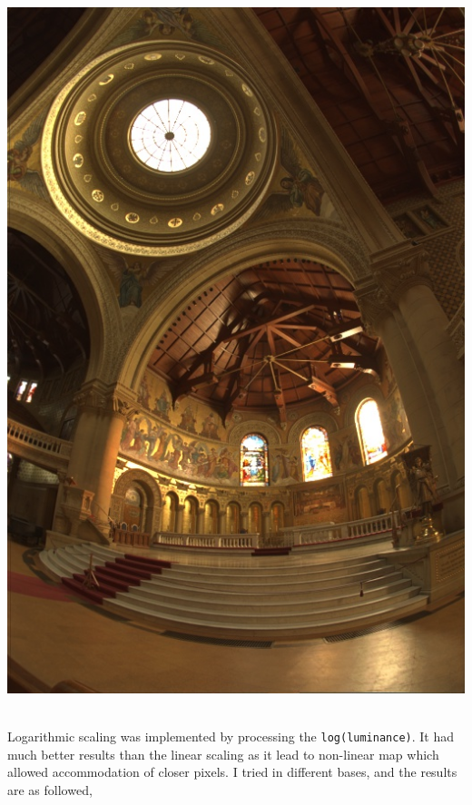 \documentclass{article}
\begin{document}
\begin{itemize}
        \includegraphics[scale=.25]{./data/1/linscl/md.jpg}
    \end{itemize}
    \\
    Logarithmic scaling was implemented by processing the \texttt{log(luminance)}. It had much better results than the linear scaling as it lead to non-linear map which allowed accommodation of closer pixels. I tried in different bases, and the results are as followed,
\end{document}
